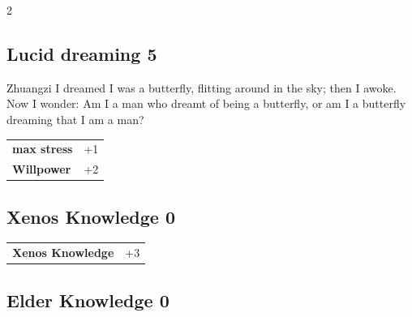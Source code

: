 \begin{multicols}{2}
\begin{tcolorbox}
\end{tcolorbox}

\begin{tcolorbox}
    \subsection*{Lucid dreaming \hfill \small{5 }}
    \tcblower


\begin{pquote}{Zhuangzi}
I dreamed I was a butterfly, flitting around in the sky; then I awoke. Now I wonder: Am I a man who dreamt of being a butterfly, or am I a butterfly dreaming that I am a man?
\end{pquote}

\vspace{3mm}

\begin{tabular}{@{}ll@{}}
    \textbf{max stress} & +1\\
    \textbf{Willpower} & +2\\
\end{tabular}


\end{tcolorbox}

\begin{tcolorbox}
    \subsection*{Xenos Knowledge \hfill \small{0 }}
    \tcblower




\begin{tabular}{@{}ll@{}}
    \textbf{Xenos Knowledge} & +3\\
\end{tabular}


\end{tcolorbox}

\begin{tcolorbox}
    \subsection*{Elder Knowledge \hfill \small{0 }}
    \tcblower





\end{tcolorbox}
\end{multicols}
